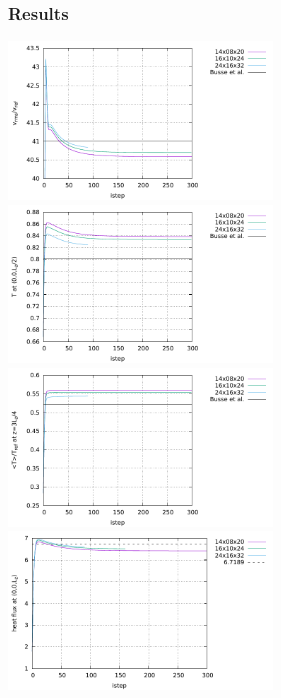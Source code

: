 \subsubsection*{Results}

\begin{center}
\includegraphics[width=7cm]{python_codes/fieldstone_20/images/vrms.pdf}
\includegraphics[width=7cm]{python_codes/fieldstone_20/images/Tmid.pdf}\\
\includegraphics[width=7cm]{python_codes/fieldstone_20/images/Tm.pdf}
\includegraphics[width=7cm]{python_codes/fieldstone_20/images/hf.pdf}\\

\end{center}

